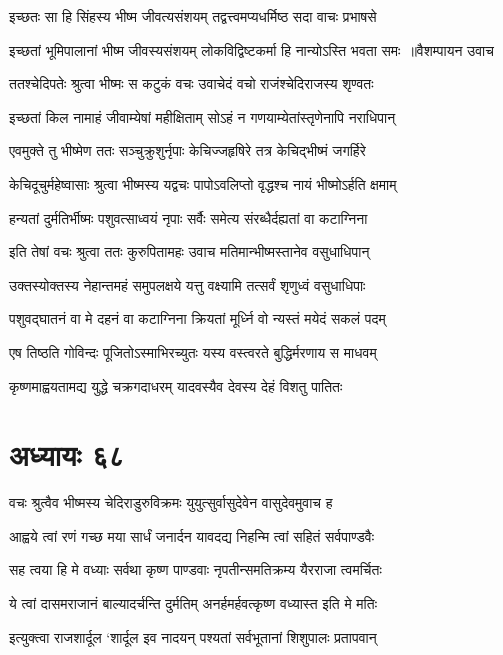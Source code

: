 \twolineshloka
{इच्छतः सा हि सिंहस्य भीष्म जीवत्यसंशयम्}
{तद्वत्त्वमप्यधर्मिष्ठ सदा वाचः प्रभाषसे}


\twolineshloka
{इच्छतां भूमिपालानां भीष्म जीवस्यसंशयम्}
{लोकविद्विष्टकर्मा हि नान्योऽस्ति भवता समः ॥वैशम्पायन उवाच}


\twolineshloka
{ततश्चेदिपतेः श्रुत्वा भीष्मः स कटुकं वचः}
{उवाचेदं वचो राजंश्चेदिराजस्य शृण्वतः}


\twolineshloka
{इच्छतां किल नामाहं जीवाम्येषां महीक्षिताम्}
{सोऽहं न गणयाम्येतांस्तृणेनापि नराधिपान्}


\twolineshloka
{एवमुक्ते तु भीष्मेण ततः सञ्चुक्रुशुर्नृपाः}
{केचिज्जहृषिरे तत्र केचिद्भीष्मं जगर्हिरे}


\twolineshloka
{केचिदूचुर्महेष्वासाः श्रुत्वा भीष्मस्य यद्वचः}
{पापोऽवलिप्तो वृद्धश्च नायं भीष्मोऽर्हति क्षमाम्}


\twolineshloka
{हन्यतां दुर्मतिर्भीष्मः पशुवत्साध्वयं नृपाः}
{सर्वैः समेत्य संरब्धैर्दह्यतां वा कटाग्निना}


\twolineshloka
{इति तेषां वचः श्रुत्वा ततः कुरुपितामहः}
{उवाच मतिमान्भीष्मस्तानेव वसुधाधिपान्}


\twolineshloka
{उक्तस्योक्तस्य नेहान्तमहं समुपलक्षये}
{यत्तु वक्ष्यामि तत्सर्वं शृणुध्वं वसुधाधिपाः}


\twolineshloka
{पशुवद्घातनं वा मे दहनं वा कटाग्निना}
{क्रियतां मूर्ध्नि वो न्यस्तं मयेदं सकलं पदम्}


\twolineshloka
{एष तिष्ठति गोविन्दः पूजितोऽस्माभिरच्युतः}
{यस्य वस्त्वरते बुद्धिर्मरणाय स माधवम्}


\twolineshloka
{कृष्णमाह्वयतामद्य युद्धे चक्रगदाधरम्}
{यादवस्यैव देवस्य देहं विशतु पातितः}


\chapter{अध्यायः ६८}
\twolineshloka
{वचः श्रुत्वैव भीष्मस्य चेदिराडुरुविक्रमः}
{युयुत्सुर्वासुदेवेन वासुदेवमुवाच ह}


\twolineshloka
{आह्वये त्वां रणं गच्छ मया सार्धं जनार्दन}
{यावदद्य निहन्मि त्वां सहितं सर्वपाण्डवैः}


\twolineshloka
{सह त्वया हि मे वध्याः सर्वथा कृष्ण पाण्डवाः}
{नृपतीन्समतिक्रम्य यैरराजा त्वमर्चितः}


\twolineshloka
{ये त्वां दासमराजानं बाल्यादर्चन्ति दुर्मतिम्}
{अनर्हमर्हवत्कृष्ण वध्यास्त इति मे मतिः}


\twolineshloka
{इत्युक्त्वा राजशार्दूल `शार्दूल इव नादयन्}
{पश्यतां सर्वभूतानां शिशुपालः प्रतापवान्}


